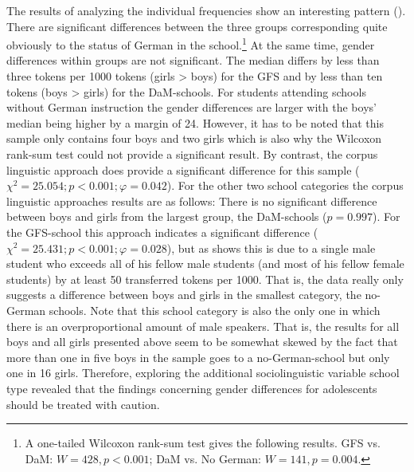 \documentclass[output=paper]{langsci/langscibook}
\begin{document}
The results of analyzing the individual frequencies show an interesting pattern (). There are significant differences between the three groups corresponding quite obviously to the status of German in the school.\footnote{A one-tailed Wilcoxon rank-sum test gives the following results. GFS vs. DaM: $W = 428, p < 0.001$; DaM vs. No German: $W = 141, p = 0.004$.} At the same time, gender differences within groups are not significant. The median differs by less than three tokens per 1000 tokens (girls > boys) for the GFS and by less than ten tokens (boys > girls) for the DaM-schools. For students attending schools without German instruction the gender differences are larger with the boys’ median being higher by a margin of 24. However, it has to be noted that this sample only contains four boys and two girls which is also why the Wilcoxon rank-sum test could not provide a significant result. By contrast, the corpus linguistic approach does provide a significant difference for this sample ($\chi^2 = 25.054; p < 0.001; \varphi = 0.042$). For the other two school categories the corpus linguistic approaches results are as follows: There is no significant difference between boys and girls from the largest group, the DaM-schools ($p = 0.997$). For the GFS-school this approach indicates a significant difference ($\chi^2 = 25.431; p < 0.001; \varphi = 0.028$), but as  shows this is due to a single male student who exceeds all of his fellow male students (and most of his fellow female students) by at least 50 transferred tokens per 1000. That is, the data really only suggests a difference between boys and girls in the smallest category, the no-German schools. Note that this school category is also the only one in which there is an overproportional amount of male speakers. That is, the results for all boys and all girls presented above seem to be somewhat skewed by the fact that more than one in five boys in the sample goes to a no-German-school but only one in 16 girls. Therefore, exploring the additional sociolinguistic variable school type revealed that the findings concerning gender differences for adolescents should be treated with caution.
\end{document}
